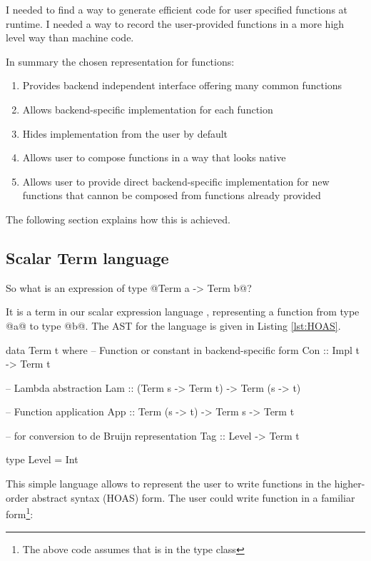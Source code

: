 \documentclass[preamble.tex]{subfiles}
\begin{document}
I needed to find a way to generate efficient code for user specified functions at runtime. I needed a way to record the user-provided functions in a more high level way than machine code.

In summary the chosen representation for functions:
\begin{enumerate}
\item Provides backend independent interface offering many common functions
\item Allows backend-specific implementation for each function
\item Hides implementation from the user by default
\item Allows user to compose functions in a way that looks native
\item Allows user to provide direct backend-specific implementation for new functions that cannon be composed from functions already provided
\end{enumerate}

The following section explains how this is achieved.

\subsection{Scalar Term language}

So what is an expression of type @Term a -> Term b@?

It is a term in our scalar expression language , representing a function from type @a@ to type @b@. The AST for the  language is given in Listing \ref{lst:HOAS}.

\begin{hscode2}[%
    caption={Term language for HOAS representation.},%
    label=lst:HOAS,%
]
data Term t where
  -- Function or constant in backend-specific form
  Con :: Impl t -> Term t

  -- Lambda abstraction
  Lam :: (Term s -> Term t) -> Term (s -> t)

  -- Function application
  App :: Term (s -> t) -> Term s -> Term t

  -- for conversion to de Bruijn representation
  Tag :: Level -> Term t

type Level = Int
\end{hscode2}

This simple language allows to represent the user to write functions in the higher-order abstract syntax (HOAS) form. The user could write function in a familiar form\footnote{The above code assumes that  is in the type class }:
\end{document}
